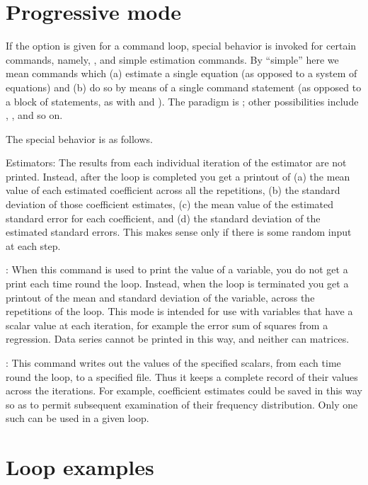\section{Progressive mode}
\label{loop-progressive}

If the  option is given for a command loop,
special behavior is invoked for certain commands, namely, ,
 and simple estimation commands.  By ``simple'' here we
mean commands which (a) estimate a single equation (as opposed to a
system of equations) and (b) do so by means of a single command
statement (as opposed to a block of statements, as with  and
).  The paradigm is ; other possibilities include
, ,  and so on.

The special behavior is as follows.

Estimators: The results from each individual iteration of the
estimator are not printed.  Instead, after the loop is completed you
get a printout of (a) the mean value of each estimated coefficient
across all the repetitions, (b) the standard deviation of those
coefficient estimates, (c) the mean value of the estimated standard
error for each coefficient, and (d) the standard deviation of the
estimated standard errors.  This makes sense only if there is some
random input at each step.

: When this command is used to print the value of a
variable, you do not get a print each time round the loop.  Instead,
when the loop is terminated you get a printout of the mean and
standard deviation of the variable, across the repetitions of the
loop.  This mode is intended for use with variables that have a scalar
value at each iteration, for example the error sum of squares from a
regression.  Data series cannot be printed in this way, and neither
can matrices.

: This command writes out the values of the specified
scalars, from each time round the loop, to a specified file.  Thus it
keeps a complete record of their values across the iterations.  For
example, coefficient estimates could be saved in this way so as to
permit subsequent examination of their frequency distribution.  Only
one such  can be used in a given loop.

\section{Loop examples}
\label{loop-examples}


